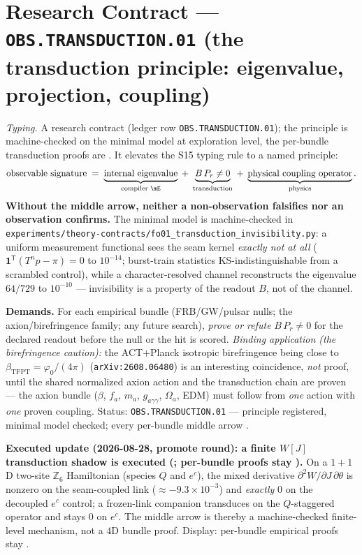 \documentclass[11pt,a4paper]{article}
\begin{document}
\section*{Research Contract --- \texttt{OBS.TRANSDUCTION.01} (the transduction principle: eigenvalue, projection, coupling)}
\noindent\emph{Typing.} A research contract (ledger row \texttt{OBS.TRANSDUCTION.01}); the
principle is machine-checked on the minimal model at exploration level, the per-bundle
transduction proofs are \mO.  It elevates the S15 typing rule to a named principle:
\[
  \text{observable signature}
  \;=\;
  \underbrace{\text{internal eigenvalue}}_{\text{compiler \mE}}
  \;+\;
  \underbrace{B\,P_r\neq0}_{\text{transduction}}
  \;+\;
  \underbrace{\text{physical coupling operator}}_{\text{physics}} .
\]
\textbf{Without the middle arrow, neither a non-observation falsifies nor an observation
confirms.}  The minimal model is machine-checked in
\texttt{experiments/\allowbreak theory-contracts/\allowbreak fo01\_transduction\_invisibility.py}: a uniform measurement
functional sees the seam kernel \emph{exactly not at all} ($\mathbf1^{\mathsf T}(T^np-\pi)=0$ to
$10^{-14}$; burst-train statistics KS-indistinguishable from a scrambled control), while a
character-resolved channel reconstructs the eigenvalue $64/729$ to $10^{-10}$ --- invisibility
is a property of the readout $B$, not of the channel.

\par\smallskip\noindent\textbf{Demands.}  For each empirical bundle (FRB/GW/pulsar nulls; the
axion/birefringence family; any future search), \emph{prove or refute} $B\,P_r\neq0$ for the
declared readout before the null or the hit is scored.  \emph{Binding application (the
birefringence caution):} the ACT$+$Planck isotropic birefringence being close to
$\beta_{\mathrm{TFPT}}=\varphi_0/(4\pi)$ (\texttt{arXiv:2608.06480}) is an interesting
coincidence, \emph{not} proof, until the shared normalized axion action and the transduction
chain are proven --- the axion bundle ($\beta$, $f_a$, $m_a$, $g_{a\gamma\gamma}$, $\Omega_a$,
EDM) must follow from \emph{one} action with \emph{one} proven coupling.  Status:
\texttt{OBS.TRANSDUCTION.01} --- principle registered, minimal model checked; every per-bundle
middle arrow \mO.

\par\smallskip\noindent\textbf{Executed update (2026-08-28, promote round): a finite $W[J]$
transduction shadow is executed
(; per-bundle
proofs stay \mO).}
On a $1{+}1$D two-site $\mathbb Z_6$ Hamiltonian (species $Q$ and $e^c$), the mixed derivative
$\partial^2 W/\partial J\,\partial\theta$ is nonzero on the seam-coupled link
($\approx-9.3\times10^{-3}$) and \emph{exactly} $0$ on the decoupled $e^c$ control; a
frozen-link companion transduces on the $Q$-staggered operator and stays $0$ on $e^c$.
The middle arrow is thereby a machine-checked finite-level mechanism, not a $4$D bundle proof.
Display: per-bundle empirical proofs stay \mO.
\end{document}
